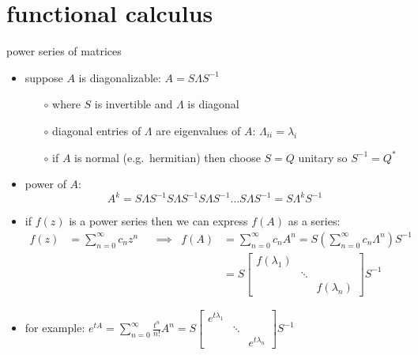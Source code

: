 \documentclass[10pt,hyperref]{beamer}
\begin{document}
\section{functional calculus}

\begin{frame}{power series of matrices}

\begin{itemize}
\item suppose $A$ is diagonalizable: $A = S \Lambda S^{-1}$
    \begin{itemize}
    \item[$\circ$] where $S$ is invertible and $\Lambda$ is diagonal
    \item[$\circ$] diagonal entries of $\Lambda$ are eigenvalues of $A$: $\Lambda_{ii} = \lambda_i$
    \item[$\circ$] if $A$ is normal (e.g.~hermitian) then choose $S=Q$ unitary so $S^{-1}=Q^*$
    \end{itemize}
\item power of $A$:
    $$A^k = S \Lambda S^{-1} S \Lambda S^{-1} S \Lambda S^{-1} \dots S \Lambda S^{-1} = S \Lambda^k S^{-1}$$
\item if $f(z)$ is a power series then we can express $f(A)$ as a series:
\small
\begin{align*}
f(z) &= \sum_{n=0}^\infty c_n z^n & &\implies & f(A) &= \sum_{n=0}^\infty c_n A^n = S \left(\sum_{n=0}^\infty c_n \Lambda^n\right) S^{-1} \\
     &&&& &= S \begin{bmatrix} f(\lambda_1) & & \\ & \ddots & \\ & & f(\lambda_n) \end{bmatrix} S^{-1}
\end{align*}
\normalsize
\item for example: \qquad \small
$\displaystyle e^{tA} = \sum_{n=0}^\infty \frac{t^n}{n!} A^n =  S \begin{bmatrix} e^{t\lambda_1} & & \\ & \ddots & \\ & & e^{t\lambda_n} \end{bmatrix} S^{-1}$
\end{itemize}
\end{frame}
\end{document}
